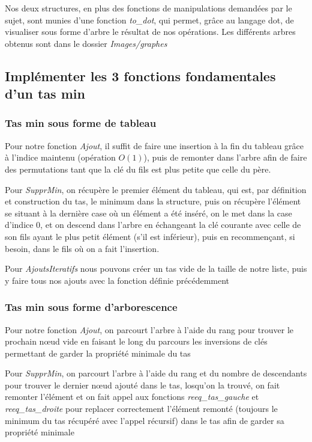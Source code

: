 \documentclass[12pt,a4paper]{article}
\begin{document}
Nos deux structures, en plus des fonctions de manipulations demandées par le sujet, sont munies d'une fonction \textit{to\_dot}, qui permet, grâce au langage dot, de visualiser sous forme d'arbre le résultat de nos opérations. Les différents arbres obtenus sont dans le dossier \textit{Images/graphes}

\subsection{Implémenter les 3 fonctions fondamentales d'un tas min}

\subsubsection{Tas min sous forme de tableau}

Pour notre fonction \textit{Ajout}, il suffit de faire une insertion à la fin du tableau grâce à l'indice maintenu (opération $O(1)$), puis de remonter dans l'arbre afin de faire des permutations tant que la clé du fils est plus petite que celle du père. 

Pour \textit{SupprMin}, on récupère le premier élément du tableau, qui est, par définition et construction du tas, le minimum dans la structure, puis on récupère l'élément se situant à la dernière case où un élément a été inséré, on le met dans la case d'indice 0, et on descend dans l'arbre en échangeant la clé courante avec celle de son fils ayant le plus petit élément (s'il est inférieur), puis en recommençant, si besoin, dans le fils où on a fait l'insertion.

Pour \textit{AjoutsIteratifs} nous pouvons créer un tas vide de la taille de notre liste, puis y faire tous nos ajouts avec la fonction définie précédemment


\subsubsection{Tas min sous forme d'arborescence}

Pour notre fonction \textit{Ajout}, on parcourt l'arbre à l'aide du rang pour trouver le prochain nœud vide en faisant le long du parcours les inversions de clés permettant de garder la propriété minimale du tas

Pour \textit{SupprMin}, on parcourt l'arbre à l'aide du rang et du nombre de descendants pour trouver le dernier nœud ajouté dans le tas, losqu'on la trouvé, on fait remonter l'élément et on fait appel aux fonctions \textit{reeq\_tas\_gauche} et \textit{reeq\_tas\_droite} pour replacer correctement l'élément remonté (toujours le minimum du tas récupéré avec l'appel récursif) dans le tas afin de garder sa propriété minimale
\end{document}

